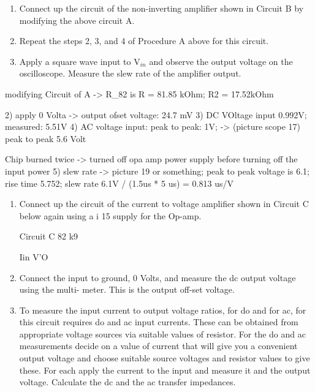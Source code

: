 
\begin{enumerate}
	\item Connect up the circuit of the non-inverting amplifier shown in Circuit B by modifying the
above circuit A.

	\item Repeat the steps 2, 3, and 4 of Procedure A above for this circuit.

	\item Apply a square wave input to V$_{in}$ and observe the output voltage on the oscilloscope.
Measure the slew rate of the amplifier output.
\end{enumerate}

modifying Circuit of A -> R_82 is R = 81.85 kOhm; R2 = 17.52kOhm 

2) apply 0 Volta -> output ofset voltage: 24.7 mV
3) DC VOltage input 0.992V; measured: 5.51V
4) AC voltage input: peak to peak: 1V; -> (picture scope 17) peak to peak 5.6 Volt

Chip burned twice -> turned off opa amp power supply before turning off the input power
5) slew rate -> picture 19 or something; peak to peak voltage is 6.1; rise time 5.752; slew rate 6.1V / (1.5us * 5 us) = 0.813 us/V





\begin{enumerate}
	\item Connect up the circuit of the current to voltage amplifier shown in Circuit C below again
using a i 15 supply for the Op-amp.

Circuit C 82 k9

Iin
V'O

	\item Connect the input to ground, 0 Volts, and measure the dc output voltage using the multi-
meter. This is the output off-set voltage.

	\item To measure the input current to output voltage ratios, for do and for ac, for this circuit
requires do and ac input currents. These can be obtained from appropriate voltage sources
via suitable values of resistor. For the do and ac measurements decide on a value of current
that will give you a convenient output voltage and choose suitable source voltages and
resistor values to give these. For each apply the current to the input and measure it and the
output voltage. Calculate the dc and the ac transfer impedances.

\end{enumerate}

